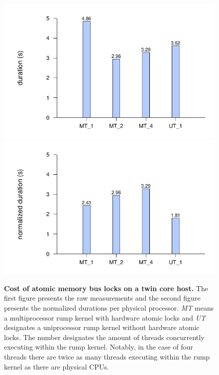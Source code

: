 \begin{figure}[t]
\includegraphics{tmpfscreate}
\includegraphics{tmpfscreate2}
\caption[Cost of atomic memory bus locks on a twin core host]{
\textbf{Cost of atomic memory bus locks on a twin core host.}
The first figure presents the raw measurements and the second figure
presents the normalized durations per physical processor.
\textit{MT} means a multiprocessor rump kernel with hardware atomic
locks and \textit{UT} designates a uniprocessor rump kernel without
hardware atomic locks.  The number designates the amount of threads
concurrently executing within the rump kernel.  Notably,
in the case of four threads there are twice as many threads executing
within the rump kernel as there are physical CPUs.
}
\label{fig:tmpfscreate}
\end{figure}
\clearpage

